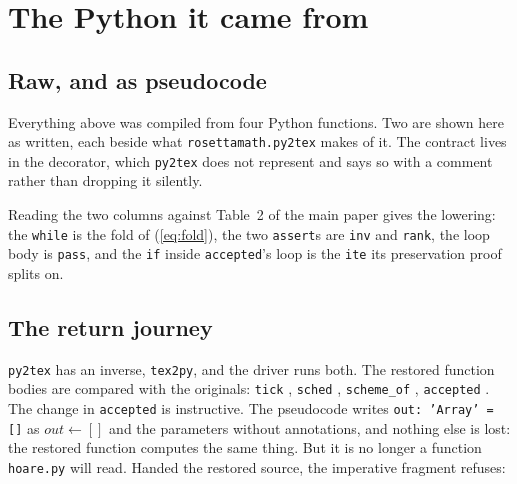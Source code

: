 \documentclass[11pt]{article}
\newcommand{\code}[1]{\texttt{#1}}
\begin{document}
\section{The Python it came from}
\label{sec:python}

\subsection{Raw, and as pseudocode}

Everything above was compiled from four Python functions. Two are shown here
as written, each beside what \code{rosettamath.py2tex} makes of it. The
contract lives in the decorator, which \code{py2tex} does not represent and
says so with a comment rather than dropping it silently.

\noindent
\begin{minipage}[t]{0.45\textwidth}

\end{minipage}\hfill
\begin{minipage}[t]{0.53\textwidth}
\footnotesize

\end{minipage}

\medskip
\noindent
\begin{minipage}[t]{0.45\textwidth}

\end{minipage}\hfill
\begin{minipage}[t]{0.53\textwidth}
\footnotesize

\end{minipage}

\medskip
Reading the two columns against Table~2 of the main paper gives the lowering:
the \code{while} is the fold of (\ref{eq:fold}), the two \code{assert}s are
\code{inv} and \code{rank}, the loop body is \code{pass}, and the \code{if}
inside \code{accepted}'s loop is the \code{ite} its preservation proof splits
on.

\subsection{The return journey}

\code{py2tex} has an inverse, \code{tex2py}, and the driver runs both. The
restored function bodies are compared with the originals: \code{tick}
\pyRoundtripTick, \code{sched} \pyRoundtripSched, \code{scheme\_of}
\pyRoundtripSchemeof, \code{accepted} \pyRoundtripAccepted. The change in
\code{accepted} is instructive. The pseudocode writes
\code{out: 'Array' = []} as $\mathit{out} \gets []$ and the parameters without
annotations, and nothing else is lost: the restored function computes the
same thing. But it is no longer a function \code{hoare.py} will read. Handed
the restored source, the imperative fragment refuses:
\end{document}

